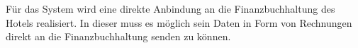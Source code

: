 \documentclass[../../Pflichtenheft.tex]{subfiles}
\begin{document}
    Für das System wird eine direkte Anbindung an die Finanzbuchhaltung des Hotels realisiert.
    In dieser muss es möglich sein Daten in Form von Rechnungen direkt an die Finanzbuchhaltung senden zu können.
\end{document}
